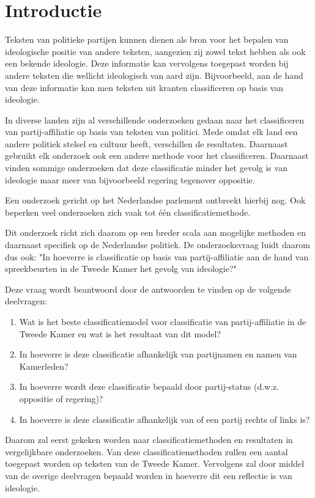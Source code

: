 \section{Introductie}
\label{sec:intro}
Teksten van politieke partijen kunnen dienen als bron voor het bepalen van ideologische positie van andere teksten, aangezien zij zowel tekst hebben als ook een bekende ideologie. Deze informatie kan vervolgens toegepast worden bij andere teksten die wellicht ideologisch van aard zijn. Bijvoorbeeld, aan de hand van deze informatie kan men teksten uit kranten classificeren op basis van ideologie\cite{DBLP:journals/corr/Biessmann16,Hirst_textto}.\par
In diverse landen zijn al verschillende onderzoeken gedaan naar het classificeren van partij-affiliatie op basis van teksten van politici\cite{Ferreira2016UsingTT,DBLP:journals/corr/Biessmann16}. Mede omdat elk land een andere politiek stelsel en cultuur heeft, verschillen de resultaten. Daarnaast gebruikt elk onderzoek ook een andere methode voor het classificeren. Daarnaast vinden sommige onderzoeken dat deze classificatie minder het gevolg is van ideologie maar meer van bijvoorbeeld regering tegenover oppositie.\cite{Hirst_textto}\par
Een onderzoek gericht op het Nederlandse parlement ontbreekt hierbij nog. Ook beperken veel onderzoeken zich vaak tot één classificatiemethode.\par
Dit onderzoek richt zich daarom op een breder scala aan mogelijke methoden en daarnaast specifiek op de Nederlandse politiek. De onderzoeksvraag luidt daarom dus ook: "In hoeverre is classificatie op basis van partij-affiliatie aan de hand van spreekbeurten in de Tweede Kamer het gevolg van ideologie?"\par
Deze vraag wordt beantwoord door de antwoorden te vinden op de volgende deelvragen:
\begin{enumerate}
    \item Wat is het beste classificatiemodel voor classificatie van partij-affiliatie in de Tweede Kamer en wat is het resultaat van dit model?
    \item In hoeverre is deze classificatie afhankelijk van partijnamen en namen van Kamerleden?
    \item In hoeverre wordt deze classificatie bepaald door partij-status (d.w.z. oppositie of regering)?
    \item In hoeverre is deze classificatie afhankelijk van of een partij rechts of links is?
\end{enumerate}
Daarom zal eerst gekeken worden naar classificatiemethoden en resultaten in vergelijkbare onderzoeken. Van deze classificatiemethoden zullen een aantal toegepast worden op teksten van de Tweede Kamer. Vervolgens zal door middel van de overige deelvragen bepaald worden in hoeverre dit een reflectie is van ideologie.


